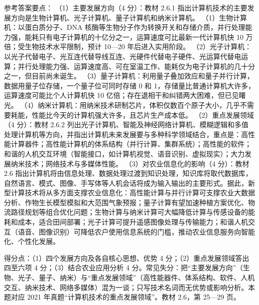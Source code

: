 \documentclass[a4paper,11pt]{article}
\begin{document}

\q 参考答案要点：
（1）主要发展方向（4 分）：教材 2.6.1 指出计算机技术的主要发展方向是生物计算机、光子计算机、量子计算机和纳米计算机。
（1）生物计算机：以蛋白质分子、DNA 核酶等生物分子作为转换开关和存储介质，并行处理能力强，能耗只有电子计算机的十亿分之一，运算速度可比最新一代计算机快 10 万倍；受生物技术水平限制，预计 10—20 年后进入实用阶段。
（2）光子计算机：以光子代替电子、光互连代替导线互连、光硬件代替电子硬件、光运算代替电运算；并行处理能力强、运算速度高、可在室温工作、能耗仅为电子计算机的几十分之一，但目前尚未诞生。
（3）量子计算机：利用量子叠加效应和量子并行计算，数据用量子位存储，一个量子位可同时存储 0 和 1，存储量比普通计算机大许多，运算速度可能比个人计算机快 10 亿倍；存在退相干和纠错两大困难，但已见曙光。
（4）纳米计算机：用纳米技术研制芯片，体积仅数百个原子大小，几乎不需要耗能，性能比今天的计算机强大许多，且芯片生产成本低。
（2）重点发展领域（4 分）：教材 2.6.2 列出光子计算机、智能及神经网络计算机、模糊逻辑和多值处理计算机等方向，并指出计算机未来发展要与多种科学领域结合，重点是：高性能计算器件；高性能计算机的体系结构（并行计算、集群系统）；高性能的软件；和谐的人机交互环境（智能接口，如计算机视觉、语音识别、虚拟现实）；大力发展纳米技术；网络技术与多媒体性能。
（3）对农业信息化的影响（4 分）：教材 2.6 指出计算机将由信息处理、数据处理过渡到知识处理，知识库将取代数据库，自然语言、模式、图像、手写体等人机会话将成为输入输出的主要形式。据此，新型计算技术将从多方面支撑农业信息化：高性能计算与并行计算可支撑农业大数据分析、作物生长模型模拟和大范围气象预报；量子计算有望加速种植方案优化、物流路径规划等组合优化问题；生物计算与纳米计算可大幅降低计算与传感设备的能耗和成本，适合田间部署；光子计算可提升遥感图像处理与传输能力；和谐人机交互（语音、图像识别）可降低农户使用信息系统的门槛，推动农业信息服务向智能化、个性化发展。
\begin{analysis}得分点：（1）四个发展方向及各自核心思想、优势 4 分；（2）重点发展领域答出四至六项 4 分；（3）结合农业应用分析 4 分。常见失分：把“主要发展方向”（生物、光子、量子、纳米）与“重点发展领域”（高性能器件、体系结构、软件、人机交互、纳米技术、网络多媒体）混为一谈；只写技术名词而无优势或影响分析。本题对应 2021 年真题“计算机技术的重点发展领域”。教材 2.6，第 25—29 页。\end{analysis}
\end{document}
